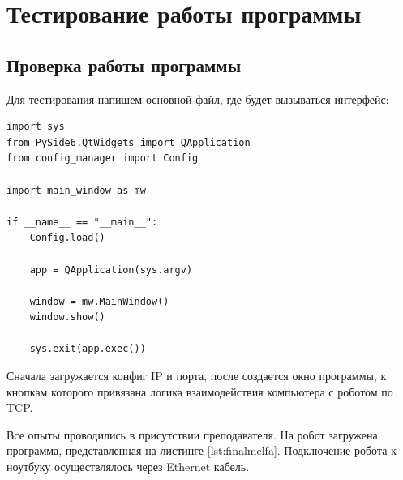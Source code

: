 \documentclass[a4paper,14pt]{extarticle}
\begin{document}
\section{Тестирование работы программы}
\subsection{Проверка работы программы}
Для тестирования напишем основной файл, где будет вызываться интерфейс:
\begin{lstlisting}[label=lst:main, caption={Точка входа программы.}]
import sys
from PySide6.QtWidgets import QApplication
from config_manager import Config

import main_window as mw

if __name__ == "__main__":
    Config.load()

    app = QApplication(sys.argv)

    window = mw.MainWindow()
    window.show()

    sys.exit(app.exec())
\end{lstlisting}


Сначала загружается конфиг IP и порта, после создается окно программы,
к кнопкам которого привязана логика взаимодействия компьютера с роботом по TCP.


Все опыты проводились в присутствии преподавателя.
На робот загружена программа, представленная на листинге \ref{lst:finalmelfa}.
Подключение робота к ноутбуку осуществлялось через Ethernet кабель.
\end{document}
